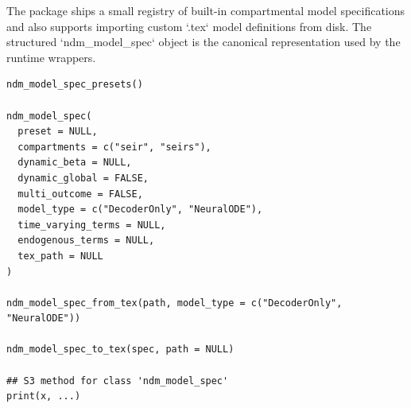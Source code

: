 \documentclass[a4paper]{book}
\begin{document}
%
\begin{Description}
The package ships a small registry of built-in compartmental model
specifications and also supports importing custom `.tex` model definitions
from disk. The structured `ndm\_model\_spec` object is the canonical
representation used by the runtime wrappers.
\end{Description}
%
\begin{Usage}
\begin{verbatim}
ndm_model_spec_presets()

ndm_model_spec(
  preset = NULL,
  compartments = c("seir", "seirs"),
  dynamic_beta = NULL,
  dynamic_global = FALSE,
  multi_outcome = FALSE,
  model_type = c("DecoderOnly", "NeuralODE"),
  time_varying_terms = NULL,
  endogenous_terms = NULL,
  tex_path = NULL
)

ndm_model_spec_from_tex(path, model_type = c("DecoderOnly", "NeuralODE"))

ndm_model_spec_to_tex(spec, path = NULL)

## S3 method for class 'ndm_model_spec'
print(x, ...)
\end{verbatim}
\end{Usage}
%
\end{document}
